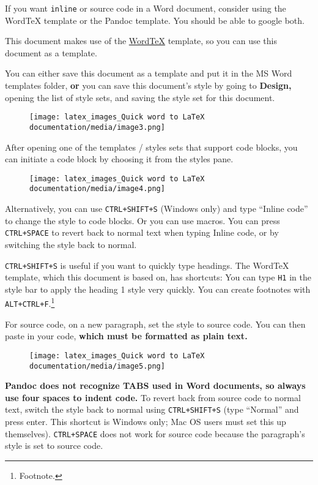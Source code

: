 \documentclass[
]{article}
\theoremstyle{plain}
\theoremstyle{remark}
\theoremstyle{definition}
\begin{document}
If you want \texttt{inline} or source code in a Word document, consider
using the WordTeX template or the Pandoc template. You should be able to
google both.

This document makes use of the
\href{https://www.youtube.com/watch?v=jlX_pThh7z8/}{WordTeX} template,
so you can use this document as a template.

You can either save this document as a template and put it in the MS
Word templates folder, \textbf{or} you can save this document's style by
going to \textbf{Design,} opening the list of style sets, and saving the
style set for this document.


\begin{figure}[H]
\centering
\texttt{[image: latex\_images\_Quick word to LaTeX documentation/media/image3.png]}
\end{figure}

After opening one of the templates / styles sets that support code
blocks, you can initiate a code block by choosing it from the styles
pane.


\begin{figure}[H]
\centering
\texttt{[image: latex\_images\_Quick word to LaTeX documentation/media/image4.png]}
\end{figure}

Alternatively, you can use \texttt{CTRL+SHIFT+S} (Windows only) and type
``Inline code'' to change the style to code blocks. Or you can use
macros. You can press \texttt{CTRL+SPACE} to revert back to normal text
when typing Inline code, or by switching the style back to normal.

\texttt{CTRL+SHIFT+S} is useful if you want to quickly
type headings. The WordTeX template, which this document is based on,
has shortcuts: You can type \texttt{H1} in the style bar to apply the
heading 1 style very quickly. You can create footnotes with
\texttt{ALT+CTRL+F}.\footnote{Footnote.}

For source code, on a new paragraph, set the style to source code. You
can then paste in your code, \textbf{which must be formatted as plain
text.}


\begin{figure}[H]
\centering
\texttt{[image: latex\_images\_Quick word to LaTeX documentation/media/image5.png]}
\end{figure}

\textbf{Pandoc does not recognize TABS used in Word documents, so always
use four spaces to indent code.} To revert back from source code to
normal text, switch the style back to normal using \texttt{CTRL+SHIFT+S}
(type ``Normal'' and press enter. This shortcut is Windows only; Mac OS
users must set this up themselves). \texttt{CTRL+SPACE} does not work
for source code because the paragraph's style is set to source code.
\end{document}
